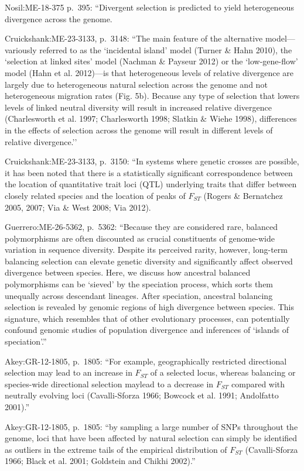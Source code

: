 \documentclass[11pt]{article}
\begin{document}
Nosil:ME-18-375 p.~395: ``Divergent selection is predicted to yield
heterogeneous divergence across the genome.

Cruickshank:ME-23-3133, p.~3148: ``The main feature of the alternative
model---variously referred to as the `incidental island’ model (Turner
\& Hahn 2010), the `selection at linked sites’ model (Nachman \&
Payseur 2012) or the `low-gene-flow’ model (Hahn et al. 2012)---is
that heterogeneous levels of relative divergence are largely due to
heterogeneous natural selection across the genome and not
heterogeneous migration rates (Fig. 5b). Because any type of selection
that lowers levels of linked neutral diversity will result in
increased relative divergence (Charlesworth et al. 1997; Charlesworth
1998; Slatkin \& Wiehe 1998), differences in the effects of selection
across the genome will result in different levels of relative
divergence.''

Cruickshank:ME-23-3133, p.~3150: ``In systems where genetic crosses
are possible, it has been noted that there is a statistically
significant correspondence between the location of quantitative trait
loci (QTL) underlying traits that differ between closely related
species and the location of peaks of $F_{ST}$ (Rogers \& Bernatchez
2005, 2007; Via \& West 2008; Via 2012).

Guerrero:ME-26-5362, p.~5362: ``Because they are considered rare,
balanced polymorphisms are often discounted as crucial constituents of
genome-wide variation in sequence diversity. Despite its perceived
rarity, however, long-term balancing selection can elevate genetic
diversity and significantly affect observed divergence between
species. Here, we discuss how ancestral balanced polymorphisms can be
`sieved' by the speciation process, which sorts them unequally across
descendant lineages. After speciation, ancestral balancing selection
is revealed by genomic regions of high divergence between
species. This signature, which resembles that of other evolutionary
processes, can potentially confound genomic studies of population
divergence and inferences of `islands of speciation'.''

Akey:GR-12-1805, p.~1805: ``For example, geographically restricted
directional selection may lead to an increase in $F_{ST}$ of a
selected locus, whereas balancing or species-wide directional
selection maylead to a decrease in $F_{ST}$ compared with neutrally
evolving loci (Cavalli-Sforza 1966; Bowcock et al. 1991; Andolfatto
2001).''

Akey:GR-12-1805, p.~1805: ``by sampling a large number of SNPs
throughout the genome, loci that have been affected by natural
selection can simply be identified as outliers in the extreme tails of
the empirical distribution of $F_{ST}$ (Cavalli-Sforza 1966; Black et
al. 2001; Goldstein and Chikhi 2002).''
\end{document}
